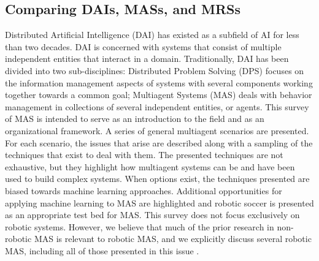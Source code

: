 \subsection{Comparing DAIs, MASs, and MRSs}

Distributed Artificial Intelligence (DAI) has existed as a subfield of AI for less than two decades. DAI is concerned with systems that consist of multiple independent entities that interact in a domain. Traditionally, DAI has been divided into two sub-disciplines: Distributed Problem Solving (DPS) focuses on the information management aspects of systems with several components working together towards a common goal; Multiagent Systems (MAS) deals with behavior management in collections of several independent entities, or agents. This survey of MAS is intended to serve as an introduction to the field and as an organizational framework. A series of general multiagent scenarios are presented. For each scenario, the issues that arise are described along with a sampling of the techniques that exist to deal with them. The presented techniques are not exhaustive, but they highlight how multiagent systems can be and have been used to build complex systems. When options exist, the techniques presented are biased towards machine learning approaches. Additional opportunities for applying machine learning to MAS are highlighted and robotic soccer is presented as an appropriate test bed for MAS. This survey does not focus exclusively on robotic systems. However, we believe that much of the prior research in non-robotic MAS is relevant to robotic MAS, and we explicitly discuss several robotic MAS, including all of those presented in this issue \cite{ref:stone2000multiagent}.